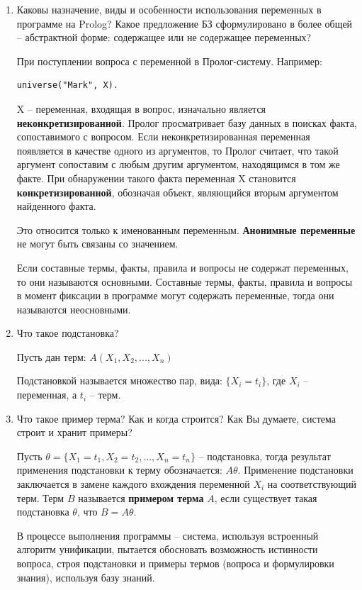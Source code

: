 \documentclass[a4paper,14pt]{extreport} %
\begin{document}
\begin{enumerate}
\item Каковы назначение, виды и особенности использования переменных в программе на Prolog? Какое предложение БЗ сформулировано в более общей – абстрактной форме: содержащее или не содержащее переменных?

При поступлении вопроса с переменной в Пролог-систему. Например:
\begin{lstlisting}
universe("Mark", X).
\end{lstlisting}

X -- переменная, входящая в вопрос, изначально является \textbf{неконкретизированной}. Пролог просматривает базу данных в поисках факта, сопоставимого с вопросом. Если неконкретизированная переменная появляется в качестве одного из аргументов, то Пролог считает, что такой аргумент сопоставим с любым другим аргументом, находящимся в том же факте. При обнаружении такого факта переменная X становится \textbf{конкретизированной}, обозначая объект, являющийся вторым аргументом найденного факта.

Это относится только к именованным переменным. \textbf{Анонимные переменные} не могут быть связаны со значением.

Если составные термы, факты, правила и вопросы не содержат переменных, то они называются основными. Составные термы, факты, правила и вопросы в момент фиксации в программе могут содержать переменные, тогда они называются неосновными. 

\item Что такое подстановка?

Пусть дан терм: $A(X_1, X_2,..., X_n)$

Подстановкой называется множество пар, вида: $\{X_i = t_i\}$, 
где $X_i$ -- переменная, а $t_i$ -- терм.

\item Что такое пример терма? Как и когда строится? Как Вы думаете, система строит и хранит примеры?

Пусть $\theta = \{ X_1 = t_1, X_2= t_2, … , X_n = t_n \}$ -- подстановка,  тогда результат применения подстановки к терму обозначается: $A\theta$. Применение подстановки заключается в замене каждого вхождения переменной $X_i$  на соответствующий терм. Терм $B$ называется \textbf{примером терма} $A$, если существует такая подстановка $\theta$, что $B=A\theta$.

В процессе выполнения программы -- система, используя встроенный алгоритм унификации, пытается обосновать возможность истинности вопроса, строя подстановки и примеры термов (вопроса и формулировки знания), используя базу знаний. 

 \end{enumerate}
 
\end{document}
